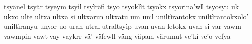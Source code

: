 \documentclass[a4paper]{article}
\begin{document}
tsyänel\hspace{2mm}
tsyär\hspace{2mm}
tsyeym\hspace{2mm}
tsyìl\hspace{2mm}
tsyìräfì\hspace{2mm}
tsyo\hspace{2mm}
tsyoklìt\hspace{2mm}
tsyokx\hspace{2mm}
tsyorina'wll\hspace{2mm}
tsyosyu\hspace{2mm}
uk\hspace{2mm}
ukxo\hspace{2mm}
ulte\hspace{2mm}
ultxa\hspace{2mm}
ultxa si\hspace{2mm}
ultxarun\hspace{2mm}
ultxatu\hspace{2mm}
um\hspace{2mm}
unil\hspace{2mm}
uniltìrantokx\hspace{2mm}
uniltìrantokxolo'\hspace{2mm}
uniltìranyu\hspace{2mm}
unyor\hspace{2mm}
uo\hspace{2mm}
uran\hspace{2mm}
utral\hspace{2mm}
utraltsyìp\hspace{2mm}
uvan\hspace{2mm}
uvan letokx\hspace{2mm}
uvan si\hspace{2mm}
var\hspace{2mm}
vawm\hspace{2mm}
vawmpin\hspace{2mm}
vawt\hspace{2mm}
vay\hspace{2mm}
vaykrr\hspace{2mm}
vä'\hspace{2mm}
väfewll\hspace{2mm}
väng\hspace{2mm}
väpam\hspace{2mm}
värumut\hspace{2mm}
ve'kì\hspace{2mm}
ve'o\hspace{2mm}
vefya\hspace{2mm}
\end{document}
